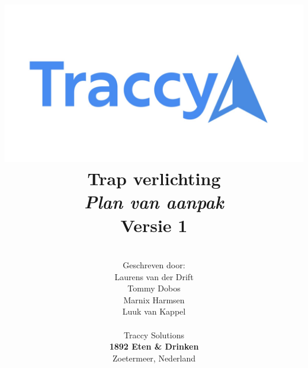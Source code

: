 \title{
\includegraphics[width=7in]{img/TraccyNew.jpg} \\
\vspace*{0.8in}
\textbf{Trap verlichting}\\
\textit{Plan van aanpak}\\
Versie 1
}
\author{
\vspace*{0.2in} \\
  Geschreven door:\\
  Laurens van der Drift\\
  Tommy Dobos\\
  Marnix Harmsen\\
  Luuk van Kappel\\
\vspace*{0.2in} \\
    Traccy Solutions\\
    \textbf{1892 Eten \& Drinken}\\
    Zoetermeer, Nederland
   } 